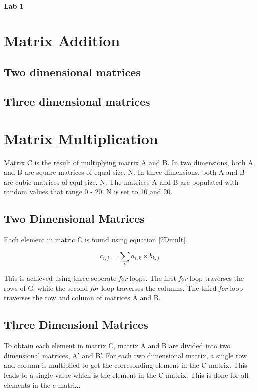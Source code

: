 \documentclass[a4paper,10pt]{article}
\begin{document}
{\LARGE{\centerline{\bf Lab 1}}}

\section{Matrix Addition}

\subsection{Two dimensional matrices}

\subsection{Three dimensional matrices}

\section{Matrix Multiplication}

Matrix C is the result of multiplying matrix A and B.
In two dimensions, both A and B are square matrices of equal size, N.
In three dimensions, both A and B are cubic matrices of equl size, N.
The matrices A and B are populated with random values that range 0 - 20.
N is set to 10 and 20.

\subsection{Two Dimensional Matrices}

Each element in matric C is found using equation \ref{2Dmult}.

\begin{equation}\label{2Dmult}
c_{i,j}=\sum_{k} a_{i,k} \times b_{k,j}
\end{equation}

This is achieved using three seperate \textit{for} loops.
The first \textit{for} loop traverses the rows of C, while the second \textit{for} loop traverses the columns.
The third \textit{for} loop traverses the row and column of matrices A and B.

\subsection{Three Dimensionl Matrices}

To obtain each element in matrix C, matrix A and B are divided into two dimensional matrices, A' and B'.
For each two dimensional matrix, a single row and column is multiplied to get the corresonding element in the C matrix.
This leads to a single value which is the element in the C matrix.
This is done for all elements in the c matrix.
\end{document}
